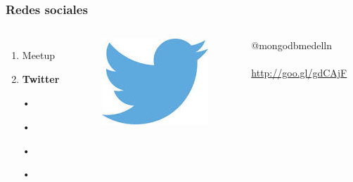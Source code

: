 \documentclass{beamer}
\begin{document}
\begin{frame}
\frametitle{Redes sociales}
\begin{columns}[c] %

\begin{enumerate}
\item Meetup
\item \textbf{Twitter}
\item[•]	
\item[•]	
\item[•]	
\item[•]	
\end{enumerate}

\begin{figure}
\includegraphics[width=0.5\linewidth]{twitter.png}
\end{figure}
{\color{blue}@mongodbmedelln}
\\~\\
{\color{blue}\url{http://goo.gl/gdCAjF}}
\end{columns}
\end{frame}
\end{document}
